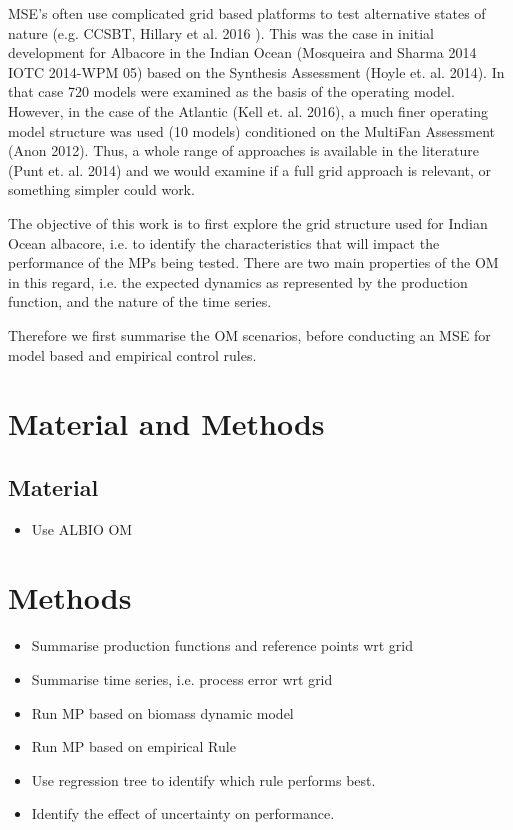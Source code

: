 \documentclass[a4paper]{article}
\begin{document}
MSE’s often use complicated grid based platforms to test alternative states of nature (e.g. CCSBT, Hillary et al. 2016 ). This was the case in initial development for Albacore in the Indian Ocean (Mosqueira and Sharma 2014 IOTC 2014-WPM 05) based on the Synthesis Assessment (Hoyle et. al. 2014). In that case 720 models were examined as the basis of the operating model. However, in the case of the Atlantic (Kell et. al. 2016), a much finer operating model structure was used (10 models) conditioned on the MultiFan Assessment (Anon 2012).  Thus, a whole range of approaches is available in the literature (Punt et. al. 2014) and we would examine if a full grid approach is relevant, or something simpler could work. 

The objective of this work is to first explore the grid structure used for Indian Ocean albacore, i.e. to identify the characteristics that will impact the performance of the MPs being tested. There are two main properties of the OM in this regard, i.e. the expected dynamics as represented by the production function, and the nature of the time series.

Therefore we first summarise the OM scenarios, before conducting an MSE for model based and empirical control rules. 

\section{Material and Methods}
\subsection{Material}

\begin{itemize}
    \item Use ALBIO OM
\end{itemize}

\section{Methods}

\begin{itemize}
    \item Summarise production functions and reference points wrt grid
    \item Summarise time series, i.e. process error wrt grid
    \item Run MP based on biomass dynamic model 
    \item Run MP based on empirical Rule
    \item Use regression tree to identify which rule performs best.
    \item Identify the effect of uncertainty on performance.
\end{itemize}
\end{document}
